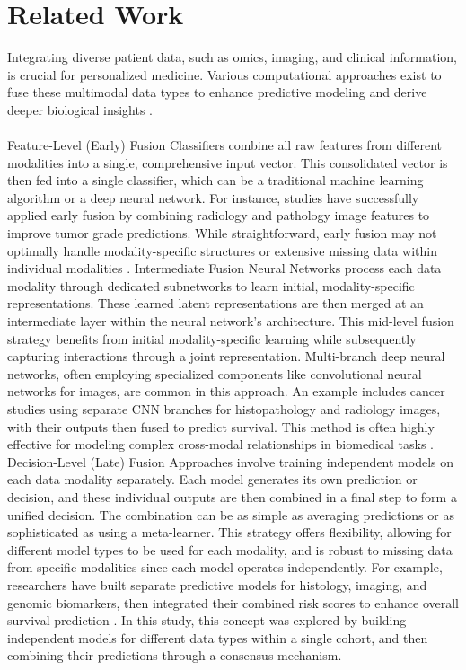 \documentclass[12pt,a4paper]{report}
\begin{document}
\chapter{Related Work}
Integrating diverse patient data, such as omics, imaging, and clinical information, is crucial for personalized medicine. Various computational approaches exist to fuse these multimodal data types to enhance predictive modeling and derive deeper biological insights \cite{Qoku2023Multimodal}.\\
\\
Feature-Level (Early) Fusion Classifiers combine all raw features from different modalities into a single, comprehensive input vector. This consolidated vector is then fed into a single classifier, which can be a traditional machine learning algorithm or a deep neural network. For instance, studies have successfully applied early fusion by combining radiology and pathology image features to improve tumor grade predictions. While straightforward, early fusion may not optimally handle modality-specific structures or extensive missing data within individual modalities \cite{Qoku2023Multimodal}. Intermediate Fusion Neural Networks process each data modality through dedicated subnetworks to learn initial, modality-specific representations. These learned latent representations are then merged at an intermediate layer within the neural network's architecture. This mid-level fusion strategy benefits from initial modality-specific learning while subsequently capturing interactions through a joint representation. Multi-branch deep neural networks, often employing specialized components like convolutional neural networks for images, are common in this approach. An example includes cancer studies using separate CNN branches for histopathology and radiology images, with their outputs then fused to predict survival. This method is often highly effective for modeling complex cross-modal relationships in biomedical tasks \cite{Qoku2023Multimodal}. Decision-Level (Late) Fusion Approaches involve training independent models on each data modality separately. Each model generates its own prediction or decision, and these individual outputs are then combined in a final step to form a unified decision. The combination can be as simple as averaging predictions or as sophisticated as using a meta-learner. This strategy offers flexibility, allowing for different model types to be used for each modality, and is robust to missing data from specific modalities since each model operates independently. For example, researchers have built separate predictive models for histology, imaging, and genomic biomarkers, then integrated their combined risk scores to enhance overall survival prediction \cite{Qoku2023Multimodal}. In this study, this concept was explored by building independent models for different data types within a single cohort, and then combining their predictions through a consensus mechanism.\\
\end{document}
